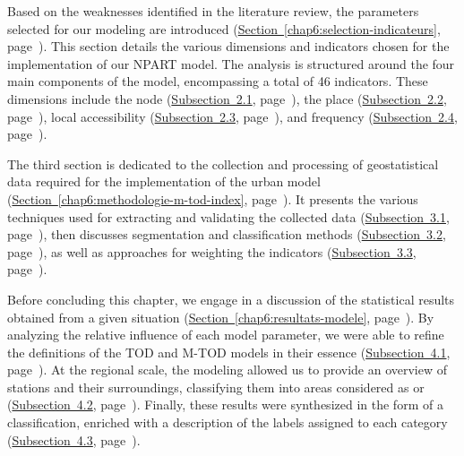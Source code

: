 \begin{refsegment}
Based on the weaknesses identified in the literature review, the parameters selected for our modeling are introduced (\hyperref[chap6:selection-indicateurs]{Section~\ref{chap6:selection-indicateurs}}, page~\pageref{chap6:selection-indicateurs}). This section details the various dimensions and indicators chosen for the implementation of our \acrfull{NPART} model. The analysis is structured around the four main components of the model, encompassing a total of 46 indicators. These dimensions include the node (\hyperref[chap6:methodologie-indicateurs-node]{Subsection~2.1}, page~\pageref{chap6:methodologie-indicateurs-node}), the place (\hyperref[chap6:methodologie-indicateurs-place]{Subsection~2.2}, page~\pageref{chap6:methodologie-indicateurs-place}), local accessibility (\hyperref[chap6:methodologie-indicateurs-accessibility]{Subsection~2.3}, page~\pageref{chap6:methodologie-indicateurs-accessibility}), and frequency (\hyperref[chap6:methodologie-indicateurs-frequentation]{Subsection~2.4}, page~\pageref{chap6:methodologie-indicateurs-frequentation}).%

The third section is dedicated to the collection and processing of geostatistical data required for the implementation of the urban model (\hyperref[chap6:methodologie-m-tod-index]{Section~\ref{chap6:methodologie-m-tod-index}}, page~\pageref{chap6:methodologie-m-tod-index}). It presents the various techniques used for extracting and validating the collected data (\hyperref[chap6:methodologie-statistiques]{Subsection~3.1}, page~\pageref{chap6:methodologie-statistiques}), then discusses segmentation and classification methods (\hyperref[chap6:methodologie-statistiques-clusterisation-classification]{Subsection~3.2}, page~\pageref{chap6:methodologie-statistiques-clusterisation-classification}), as well as approaches for weighting the indicators (\hyperref[chap6:methodologie-ponderation-indicateurs]{Subsection~3.3}, page~\pageref{chap6:methodologie-ponderation-indicateurs}).%

Before concluding this chapter, we engage in a discussion of the statistical results obtained from a given situation (\hyperref[chap6:resultats-modele]{Section~\ref{chap6:resultats-modele}}, page~\pageref{chap6:resultats-modele}). By analyzing the relative influence of each model parameter, we were able to refine the definitions of the \acrshort{TOD} and \acrshort{M-TOD} models in their essence (\hyperref[chap6:results-influence-indicateurs]{Subsection~4.1}, page~\pageref{chap6:results-influence-indicateurs}). At the regional scale, the modeling allowed us to provide an overview of stations and their surroundings, classifying them into areas considered as  or  (\hyperref[chap6:results-caracterisation-gares]{Subsection~4.2}, page~\pageref{chap6:results-caracterisation-gares}). Finally, these results were synthesized in the form of a classification, enriched with a description of the labels assigned to each category (\hyperref[chap6:results-classification-gares]{Subsection~4.3}, page~\pageref{chap6:results-classification-gares}).%


\end{refsegment}
